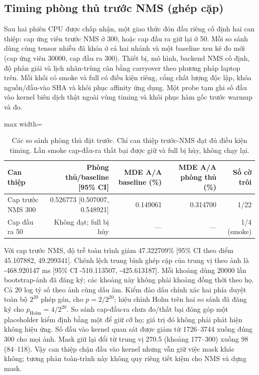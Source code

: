 \subsection{Timing phòng thủ trước NMS (ghép cặp)}
\label{app:seg-laptop-defense}
Sau hai phiên CPU được chấp nhận, một giao thức đón đầu riêng cố định hai can thiệp: cap ứng viên trước NMS ở 300, hoặc cap đầu ra giữ lại ở 50. Mỗi so sánh dùng cùng tensor nhiễu đã khóa ở cả hai nhánh và một baseline xen kẽ đo mới (cap ứng viên 30000, cap đầu ra 300). Thiết bị, mô hình, backend NMS cố định, độ phân giải và lịch nhãn-trùng cân bằng carryover theo phương pháp laptop trên. Mỗi khối có smoke và full có điều kiện riêng, cổng chất lượng độc lập, khóa nguồn/đầu-vào SHA và khôi phục affinity ứng dụng. Một probe tạm ghi số đầu vào kernel biên dịch thật ngoài vùng timing và khôi phục hàm gốc trước warmup và đo.
\begin{table}[t]\centering
\caption{Các so sánh phòng thủ đặt trước. Chỉ can thiệp trước-NMS đạt đủ điều kiện timing. Lần smoke cap-đầu-ra thất bại được giữ và full bị hủy, không chạy lại.}
\label{tab:seg-laptop-defense}
\begin{adjustbox}{max width=\textwidth}\begin{tabular}{lrrrr}\toprule
Can thiệp & Phòng thủ/baseline [95\% CI] & MDE A/A baseline (\%) & MDE A/A phòng thủ (\%) & Số cờ trôi\\\midrule
Cap trước NMS 300 & 0.526773 [0.507007, 0.548921] & 0.149061 & 0.314700 & 1/22 \\
Cap đầu ra 50 & Không đạt; full bị hủy & --- & --- & 1/4 (smoke) \\
\bottomrule\end{tabular}\end{adjustbox}\end{table}
Với cap trước NMS, độ trễ toàn trình giảm 47.322709\% [95\% CI theo điểm 45.107882, 49.299341]. Chênh lệch trung bình ghép cặp của trung vị theo ảnh là -468.920147 ms [95\% CI -510.113507, -425.613187]. Mỗi khoảng dùng 20000 lần bootstrap-ảnh đã đăng ký; các khoảng này không phải khoảng đồng thời theo họ. Cả 20 log tỷ số theo ảnh cùng dấu âm. Kiểm đảo dấu chính xác hai phía duyệt toàn bộ $2^{20}$ phép gán, cho $p=2/2^{20}$; hiệu chỉnh Holm trên hai so sánh đã đăng ký cho $p_{\mathrm{Holm}}=4/2^{20}$. So sánh cap-đầu-ra chưa đo/thất bại đóng góp một placeholder kiểm định bằng một để giữ cỡ họ; giá trị đó không phải phát hiện không hiệu ứng. Số đầu vào kernel quan sát được giảm từ 1726--3744 xuống đúng 300 cho mọi ảnh. Mask giữ lại đổi từ trung vị 270.5 (khoảng 177--300) xuống 98 (84--118). Vậy can thiệp chặn đầu vào kernel nhưng vẫn giữ việc mask khác không; tương phản toàn-trình này không quy riêng tiết kiệm cho NMS và dựng mask.
